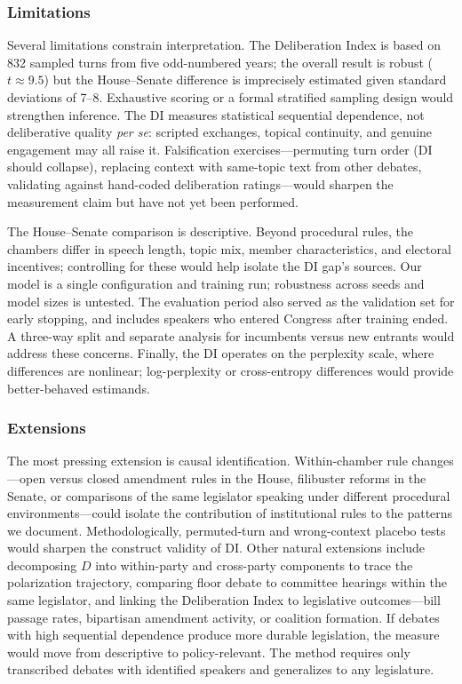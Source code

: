 \documentclass[12pt]{article}
\newcommand{\DI}{\mathit{D}}
\begin{document}
\subsubsection*{Limitations} Several limitations constrain interpretation. The Deliberation Index is based on 832 sampled turns from five odd-numbered years; the overall result is robust ($t \approx 9.5$) but the House--Senate difference is imprecisely estimated given standard deviations of 7--8. Exhaustive scoring or a formal stratified sampling design would strengthen inference. The DI measures statistical sequential dependence, not deliberative quality \textit{per se}: scripted exchanges, topical continuity, and genuine engagement may all raise it. Falsification exercises---permuting turn order (DI should collapse), replacing context with same-topic text from other debates, validating against hand-coded deliberation ratings---would sharpen the measurement claim but have not yet been performed.

The House--Senate comparison is descriptive. Beyond procedural rules, the chambers differ in speech length, topic mix, member characteristics, and electoral incentives; controlling for these would help isolate the DI gap's sources. Our model is a single configuration and training run; robustness across seeds and model sizes is untested. The evaluation period also served as the validation set for early stopping, and includes speakers who entered Congress after training ended. A three-way split and separate analysis for incumbents versus new entrants would address these concerns. Finally, the DI operates on the perplexity scale, where differences are nonlinear; log-perplexity or cross-entropy differences would provide better-behaved estimands.

\subsubsection*{Extensions} The most pressing extension is causal identification. Within-chamber rule changes---open versus closed amendment rules in the House, filibuster reforms in the Senate, or comparisons of the same legislator speaking under different procedural environments---could isolate the contribution of institutional rules to the patterns we document. Methodologically, permuted-turn and wrong-context placebo tests would sharpen the construct validity of DI. Other natural extensions include decomposing $\DI$ into within-party and cross-party components to trace the polarization trajectory, comparing floor debate to committee hearings within the same legislator, and linking the Deliberation Index to legislative outcomes---bill passage rates, bipartisan amendment activity, or coalition formation. If debates with high sequential dependence produce more durable legislation, the measure would move from descriptive to policy-relevant. The method requires only transcribed debates with identified speakers and generalizes to any legislature.
\end{document}
